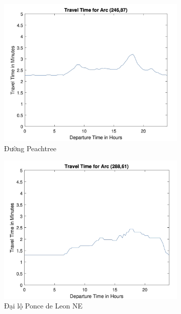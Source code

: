 \documentclass[../main.tex]{subfiles}
\begin{document}
\begin{figure}
    \centering
    \begin{subfigure}{0.45\textwidth}
        \centering
        \includegraphics{edited-images/Figure15a.jpg}
        \caption{Đường Peachtree}
        \label{fig:15a}
    \end{subfigure}
    \begin{subfigure}{0.45\textwidth}
        \centering
        \includegraphics{edited-images/Figure15b.jpg}
        \caption{Đại lộ Ponce de Leon NE}
        \label{fig:15b}
    \end{subfigure}
    \begin{subfigure}{0.45\textwidth}

\end{subfigure}
\end{figure}
\end{document}
